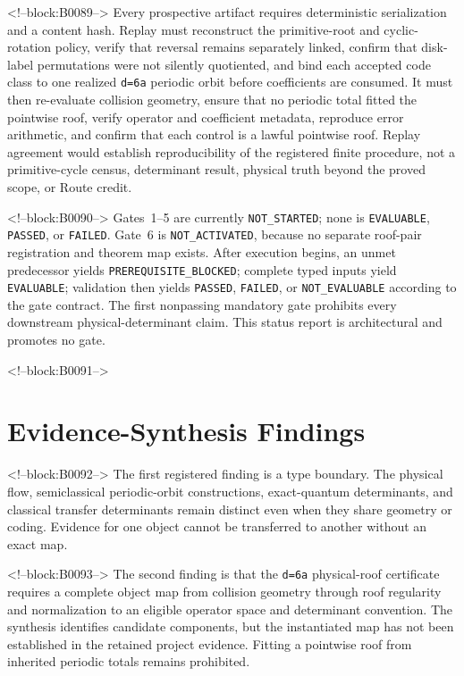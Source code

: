 \documentclass[11pt,a4paper]{article}
\begin{document}
<!--block:B0089-->
Every prospective artifact requires deterministic serialization and a content hash. Replay must reconstruct the primitive-root and cyclic-rotation policy, verify that reversal remains separately linked, confirm that disk-label permutations were not silently quotiented, and bind each accepted code class to one realized \texttt{d=6a} periodic orbit before coefficients are consumed. It must then re-evaluate collision geometry, ensure that no periodic total fitted the pointwise roof, verify operator and coefficient metadata, reproduce error arithmetic, and confirm that each control is a lawful pointwise roof. Replay agreement would establish reproducibility of the registered finite procedure, not a primitive-cycle census, determinant result, physical truth beyond the proved scope, or Route credit.

<!--block:B0090-->
Gates~1--5 are currently \texttt{NOT\_\allowbreak STARTED}; none is
\texttt{EVALUABLE}, \texttt{PASSED}, or \texttt{FAILED}.  Gate~6 is
\texttt{NOT\_\allowbreak ACTIVATED}, because no separate roof-pair registration and theorem
map exists.  After execution begins, an unmet predecessor yields
\texttt{PREREQUISITE\_\allowbreak BLOCKED}; complete typed inputs yield
\texttt{EVALUABLE}; validation then yields \texttt{PASSED},
\texttt{FAILED}, or \texttt{NOT\_\allowbreak EVALUABLE} according to the gate contract.
The first nonpassing mandatory gate prohibits every downstream
physical-determinant claim.  This status report is architectural and promotes
no gate.

<!--block:B0091-->
\section{Evidence-Synthesis Findings}

<!--block:B0092-->
The first registered finding is a type boundary. The physical flow, semiclassical periodic-orbit constructions, exact-quantum determinants, and classical transfer determinants remain distinct even when they share geometry or coding. Evidence for one object cannot be transferred to another without an exact map.

<!--block:B0093-->
The second finding is that the \texttt{d=6a} physical-roof certificate requires a complete object map from collision geometry through roof regularity and normalization to an eligible operator space and determinant convention. The synthesis identifies candidate components, but the instantiated map has not been established in the retained project evidence. Fitting a pointwise roof from inherited periodic totals remains prohibited.
\end{document}
